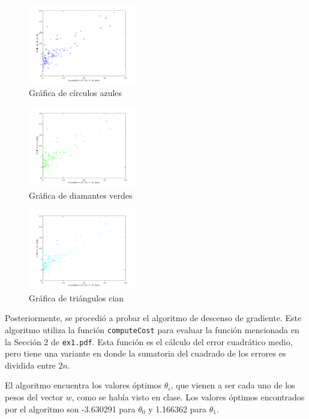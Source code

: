 \documentclass{llncs}
\begin{document}
\begin{figure}[h!]
	\centering
	\includegraphics[width=0.42\textwidth]{03-bluecircles}
	\caption{Gráfica de círculos azules}
	\label{fig:bluecircles}
\end{figure}

\begin{figure}[h!]
	\centering
	\includegraphics[width=0.42\textwidth]{03-greendiamonds}
	\caption{Gráfica de diamantes verdes}
	\label{fig:greendiamonds}
\end{figure}

\begin{figure}[h!]
	\centering
	\includegraphics[width=0.42\textwidth]{03-cyantriangles}
	\caption{Gráfica de triángulos cian}
	\label{fig:cyantriangles}
\end{figure}

Posteriormente, se procedió a probar el algoritmo de descenso de gradiente.
Este algoritmo utiliza la función \texttt{computeCost} para evaluar la función mencionada en la Sección 2 de \texttt{ex1.pdf}.
Esta función es el cálculo del error cuadrático medio,
pero tiene una variante en donde la sumatoria del cuadrado de los errores es dividida entre $2n$.

El algoritmo encuentra los valores óptimos $\theta_i$,
que vienen a ser cada uno de los pesos del vector $w$, como se había visto en clase.
Los valores óptimos encontrados por el algoritmo son -3.630291 para $\theta_0$ y 1.166362 para $\theta_1$.
\end{document}

